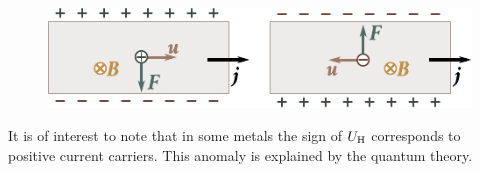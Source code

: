 \begin{figure}[t]
	\begin{center}
		\includegraphics[scale=1]{figures/ch_11/fig_11_4.pdf}
		\caption[]{}
		\label{fig:11_4}
	\end{center}
	\vspace{-0.8cm}
\end{figure}

It is of interest to note that in some metals the sign of $U_{\text{H}}$ corresponds to positive current carriers.
This anomaly is explained by the quantum theory.
